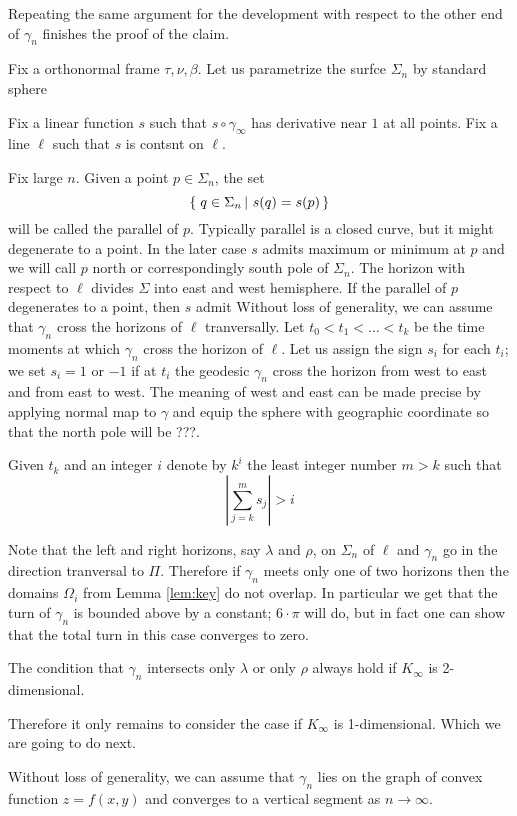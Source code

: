 \documentclass[a4paper,10pt]{amsart}
\begin{document}
Repeating the same argument for the development with respect to the other end of $\gamma_n$ finishes the proof of the claim. 

\medskip

Fix a orthonormal frame $\tau,\nu,\beta$.
Let us parametrize the surfce $\Sigma_n$ by standard sphere


Fix a linear function $s$ such that $s\circ\gamma_\infty$ 
has derivative near $1$ at all points.
Fix a line $\ell$ such that $s$ is contsnt on $\ell$.

Fix large $n$.
Given a point $p\in \Sigma_n$,
the set 
\[\set{q\in\Sigma_n}{s(q)=s(p)}\]
will be called the parallel of $p$.
Typically parallel is a closed curve,
but it might degenerate to a point.
In the later case $s$ admits maximum or minimum at $p$
and we will call $p$ north or correspondingly south pole of $\Sigma_n$.
The horizon with respect to $\ell$ divides $\Sigma$ into east and west hemisphere.
If the parallel of $p$ degenerates to a point, 
then $s$ admit
Without loss of generality, we can assume that $\gamma_n$ 
cross the horizons of $\ell$ tranversally.
Let $t_0<t_1<\dots<t_k$ be the time moments 
at which $\gamma_n$ cross the horizon of $\ell$.
Let us assign the sign $s_i$ for each $t_i$;
we set $s_i=1$ or $-1$ 
if at $t_i$ the geodesic $\gamma_n$ cross the horizon from west to east and
from east to west.
The meaning of west and east can be made precise by applying normal map to $\gamma$ and equip the sphere with geographic coordinate so that the north pole will be ???. 

Given $t_k$ and an integer 
$i$ denote by $k^i$ the least integer number $m>k$ such that
\[|\sum_{j=k}^m s_j|>i\]




Note that the left and right horizons, 
say $\lambda$ and $\rho$,
on $\Sigma_n$ of $\ell$
and $\gamma_n$ go in the direction tranversal to $\Pi$.
Therefore if $\gamma_n$ meets only one of two horizons
then the domains $\Omega_i$ from Lemma \ref{lem:key}
do not overlap.
In particular we get that the turn of $\gamma_n$ is bounded above by a constant;
$6\cdot\pi$ will do, but in fact one can show that the total turn in this case converges to zero. 

The condition that $\gamma_n$ intersects only $\lambda$ or only $\rho$ always hold if $K_\infty$ is 2-dimensional.

Therefore it only remains to consider the case if $K_\infty$ is 1-dimensional.
Which we are going to do next.

Without loss of generality, we can assume that $\gamma_n$ lies on the graph of convex function $z=f(x,y)$ and converges to a vertical segment as $n\to \infty$.
\end{document}
